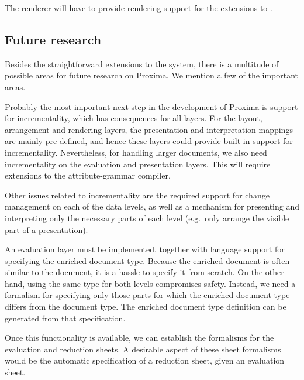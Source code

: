 
The renderer will have to provide rendering support for the extensions to {\Xprez}.

\subsection{Future research}

Besides the straightforward extensions to the system, there is a multitude of possible areas for future research on Proxima. We mention a few of the important areas.

 Probably the most important next step in the development of Proxima is support for incrementality, which has consequences for all layers. For the layout, arrangement and rendering layers, the presentation and interpretation mappings are mainly pre-defined, and hence these layers could provide built-in support for incrementality. Nevertheless, for handling larger documents, we also need incrementality on the evaluation and presentation layers. This will require extensions to the attribute-grammar compiler. 


Other issues related to incrementality are the required support for change management on each of the data levels, as well as a mechanism for presenting and interpreting only the necessary parts of each level (e.g.\ only arrange the visible part of a presentation).



 An evaluation layer must be implemented, together with language support for specifying the enriched document type. Because the enriched document is often similar to the document, it is a hassle to specify it from scratch. On the other hand, using the same type for both levels compromises safety. Instead, we need a formalism for specifying only those parts for which the enriched document type differs from the document type. The enriched document type definition can be generated from that specification.

Once this functionality is available, we can establish the formalisms for the evaluation and reduction sheets. A desirable aspect of these sheet formalisms would be the automatic specification of a reduction sheet, given an evaluation sheet.

